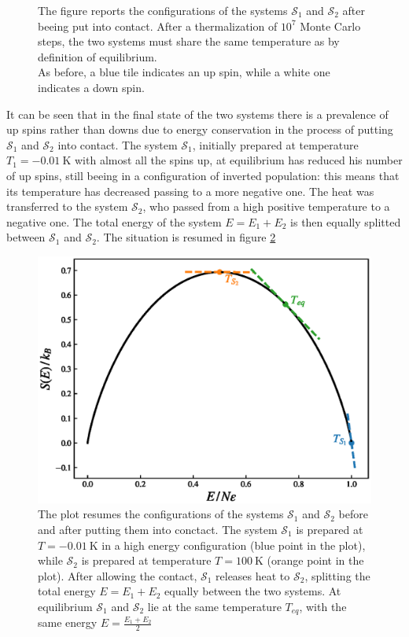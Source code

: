 \begin{figure}[hbtp]
\begin{minipage}[c]{0.45\textwidth}
    \end{minipage}
    \hfill
    \caption{The figure reports the configurations of the systems $\mathcal{S}_1$ and $\mathcal{S}_2$ after beeing put into contact. After a thermalization of $10^7$ Monte Carlo steps, the two systems must share the same temperature as by definition of equilibrium. \\
    As before, a blue tile indicates an up spin, while a white one indicates a down spin.}
    \label{fig:contact_final}
\end{figure}
It can be seen that in the final state of the two systems there is a prevalence of up spins rather than downs due to energy conservation in the process of putting $\mathcal{S}_1$ and $\mathcal{S}_2$ into contact. The system $\mathcal{S}_1$, initially prepared at temperature $T_1 = \SI{-0.01}{\kelvin}$ with almost all the spins up, at equilibrium has reduced his number of up spins, still
beeing in a configuration of inverted population: this means that its temperature has decreased passing to a more negative one. The heat was transferred to the system $\mathcal{S}_2$, who passed from a high positive temperature to a negative one. The total energy of the system $E = E_1 + E_2$ is then equally splitted between $\mathcal{S}_1$ and $\mathcal{S}_2$. The situation is resumed in figure \ref{fig:contact_E_S_1}
\begin{figure}[h!]
    \centering 
    \includegraphics[scale=0.6]{./images/ising/mixing_SE_plot.eps}
    \caption{The plot resumes the configurations of the systems $\mathcal{S}_1$ and $\mathcal{S}_2$ before and after putting them into conctact. The system $\mathcal{S}_1$ is prepared at $T = \SI{-0.01}{\kelvin}$ in a high energy configuration (blue point in the plot), while $\mathcal{S}_2$ is prepared at temperature $T = \SI{100}{\kelvin}$ (orange point in the plot). After allowing the contact, 
    $\mathcal{S}_1$ releases heat to $\mathcal{S}_2$, splitting the total energy $E = E_1 + E_2$ equally between the two systems. At equilibrium $\mathcal{S}_1$ and $\mathcal{S}_2$ lie at the same temperature $T_{eq}$, with the same energy $E = \frac{E_1 + E_2}{2}$}
    \label{fig:contact_E_S_1}
\end{figure}
